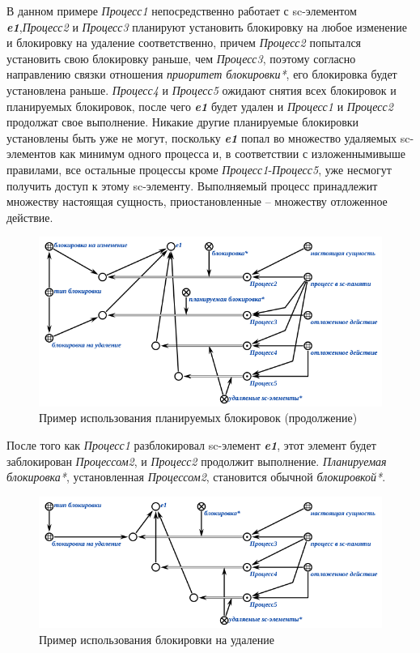 В данном примере \textit{Процесс1} непосредственно работает с sc-элементом \textit{\textbf{e1}},\textit{Процесс2} и \textit{Процесс3} планируют установить блокировку на любое изменение и блокировку на удаление соответственно, причем \textit{Процесс2} попытался установить свою блокировку раньше, чем \textit{Процесс3}, поэтому согласно направлению связки отношения \textit{приоритет блокировки*}, его блокировка будет установлена раньше. \textit{Процесс4} и \textit{Процесс5} ожидают снятия всех блокировок и планируемых блокировок, после чего \textit{\textbf{e1}} будет удален и \textit{Процесс1} и \textit{Процесс2} продолжат свое выполнение. Никакие другие планируемые блокировки установлены быть уже не могут, поскольку \textit{\textbf{e1}} попал во множество удаляемых sc-элементов как минимум одного процесса и, в соответствии с изложеннымивыше правилами, все остальные процессы кроме \textit{Процесс1}-\textit{Процесс5}, уже несмогут получить доступ к этому sc-элементу.		
Выполняемый процесс принадлежит множеству настоящая сущность, приостановленные -- множеству отложенное действие.

\begin{figure}[h]
	\centering
	\includegraphics[scale=0.8]{images/part3/chapter_situation_management/plan_lock_2.png}
	\caption{Пример использования планируемых блокировок (продолжение)}
	\label{fig:plan_lock_2}
\end{figure}

После того как \textit{Процесс1} разблокировал sc-элемент \textit{\textbf{e1}}, этот элемент будет заблокирован \textit{Процессом2}, и \textit{Процесс2} продолжит выполнение. \textit{Планируемая блокировка*}, установленная \textit{Процессом2}, становится обычной \textit{блокировкой*}.

\begin{figure}[h]
	\centering
	\includegraphics[scale=0.8]{images/part3/chapter_situation_management/plan_lock_3.png}
	\caption{Пример использования блокировки на удаление}
	\label{fig:plan_lock_3}
\end{figure}

